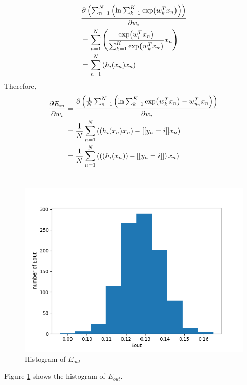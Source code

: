 \documentclass[12pt,a4paper]{article}
\begin{document}
\section{} %

\[
	\begin{aligned}
		& \pdv{\left(\sum_{n=1}^{N} \left( \ln\sum_{k=1}^{K}
			\exp({w}_{k}^{T} x_{n})\right)\right)}{w_{i}} \\
		&= \sum_{n=1}^{N} \left( \frac{\exp({w}_{i}^{T} x_{n})}
			{\sum_{k=1}^{K} \exp({w}_{k}^{T} x_{n})}x_{n} \right) \\
		&= \sum_{n=1}^{N} \left( h_{i}(x_{n}) x_{n} \right) \\
	\end{aligned}
\]
Therefore, 
\[
	\begin{aligned}
		\pdv{E_{in}}{w_{i}}
			&= \pdv{\left(\frac{1}{N} \sum_{n=1}^{N} \left( \ln \sum_{k=1}^{K} \exp({w}_{k}^{T}x_{n}) -
			{w}_{y_{n}}^{T}x_{n} \right) \right)}{w_{i}} \\
		&= \frac{1}{N} \sum_{n=1}^{N} \left( \left( h_{i}(x_{n}) x_{n} \right) -
			[[y_{n}=i]] x_{n} \right) \\
		&= \frac{1}{N} \sum_{n=1}^{N} \left( \left( \left( h_{i}(x_{n}) \right) -
			[[y_{n}=i]] \right) x_{n} \right) \\
	\end{aligned}
\]

\section{} %

\begin{figure}[h!]
	\includegraphics[width=\linewidth]{code/q7.png}
	\caption{Histogram of ${E}_{out}$}
	\label{fig:q7}
\end{figure}

Figure \ref{fig:q7} shows the histogram of ${E}_{out}$.
\end{document}
